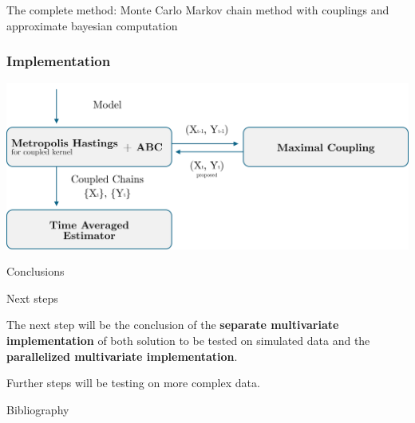 \documentclass{beamer}
\begin{document}
\begin{section}{The complete method: Monte Carlo Markov chain method with couplings and approximate bayesian computation}
	
	\begin{frame}[plain]{}
		\sectionpage
	\end{frame}

	\begin{frame}
		\frametitle{Implementation}
		\begin{center}
			\includegraphics[width=\textwidth]{img/Bayes3}
		\end{center}
	\end{frame}


\end{section}






\begin{section}{Conclusions}
	
    \begin{frame}[plain]{}
		\sectionpage
	\end{frame}

	\begin{frame}{Next steps}
	
		The next step will be the conclusion of the \textbf{separate multivariate implementation} of both solution to be tested on simulated data and the \textbf{parallelized multivariate implementation}.
		
		\vspace{0.5 cm}
		Further steps will be testing on more complex data.
	\end{frame}

	\begin{frame}{Bibliography}
		\nocite{*}
		
		\tiny{  }

	

	\end{frame}
\end{section}
\end{document}
